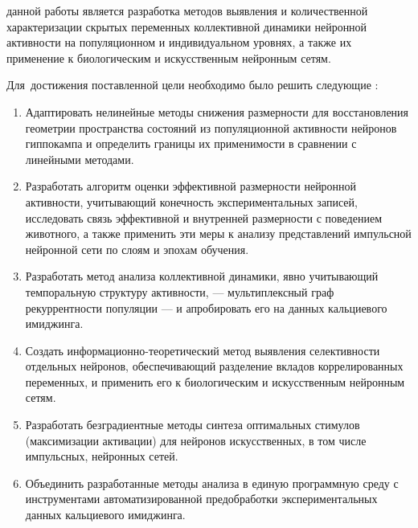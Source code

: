 {\aim} данной работы является разработка методов выявления и количественной
характеризации скрытых переменных коллективной динамики нейронной активности
на популяционном и индивидуальном уровнях, а также их применение к
биологическим и искусственным нейронным сетям.

Для~достижения поставленной цели необходимо было решить следующие {\tasks}:
\begin{enumerate}[beginpenalty=10000] %
  \item Адаптировать нелинейные методы снижения размерности для восстановления
  геометрии пространства состояний из популяционной активности нейронов
  гиппокампа и определить границы их применимости в сравнении с линейными
  методами.
  \item Разработать алгоритм оценки эффективной размерности нейронной
  активности, учитывающий конечность экспериментальных записей, исследовать
  связь эффективной и внутренней размерности с поведением животного, а также
  применить эти меры к анализу представлений импульсной нейронной сети по слоям
  и эпохам обучения.
  \item Разработать метод анализа коллективной динамики, явно учитывающий
  темпоральную структуру активности, --- мультиплексный граф рекуррентности
  популяции --- и апробировать его на данных кальциевого имиджинга.
  \item Создать информационно-теоретический метод выявления селективности
  отдельных нейронов, обеспечивающий разделение вкладов коррелированных
  переменных, и применить его к биологическим и искусственным нейронным сетям.
  \item Разработать безградиентные методы синтеза оптимальных стимулов
  (максимизации активации) для нейронов искусственных, в том числе импульсных,
  нейронных сетей.
  \item Объединить разработанные методы анализа в единую программную среду
  с инструментами автоматизированной предобработки экспериментальных данных
  кальциевого имиджинга.
\end{enumerate}



